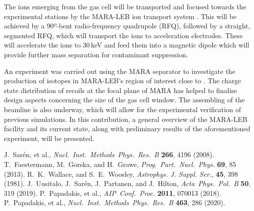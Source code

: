 \documentclass[12pt, a4paper]{article}
\begin{document}
The ions emerging from the gas cell will be transported and focused towards the experimental stations by the MARA-LEB ion transport system \cite{ion}. This will be achieved by a 90º-bent radio-frequency quadrupole (RFQ), followed by a straight, segmented RFQ, which will transport the ions to acceleration electrodes. These will accelerate the ions to 30\,keV and feed them into a magnetic dipole which will provide further mass separation for contaminant suppression. 

An experiment was carried out using the MARA separator to investigate the production of isotopes in MARA-LEB's region of interest close to . The charge state distribution of  recoils at the focal plane of MARA has helped to finalise design aspects concerning the size of the gas cell window. The assembling of the beamline is also underway, which will allow for the experimental verification of previous simulations. In this contribution, a general overview of the MARA-LEB facility and its current state, along with preliminary results of the aforementioned experiment, will be presented.






\vspace{2\baselineskip}

\begin{thebibliography}{9}
 J.~Sarén, et al., {\it Nucl.~Inst.~Methods~Phys.~Res.~B} {\bf 266}, 4196 (2008). 
 T.~Faestermann, M.~Gorska, and H.~Grawe, {\it Prog.~Part.~Nucl.~Phys.} \textbf{69}, 85 (2013).
 R.~K.~Wallace, and S.~E.~Woosley, {\it
Astrophys. J. Suppl. Ser.}, \textbf{45}, 398 (1981).
 J.~Uusitalo, J.~Sarén, J.~Partanen, and J.~Hilton, {\it Acta~Phys.~Pol.~B} {\bf 50}, 319 (2019).
 P.~Papadakis, et al., {\it AIP~Conf.~Proc.} \textbf{2011}, 070013 (2018).
 P.~Papadakis, et al., {\it Nucl.~Inst.~Methods~Phys.~Res.~B} \textbf{463}, 286 (2020).
\end{thebibliography}
\end{document}
